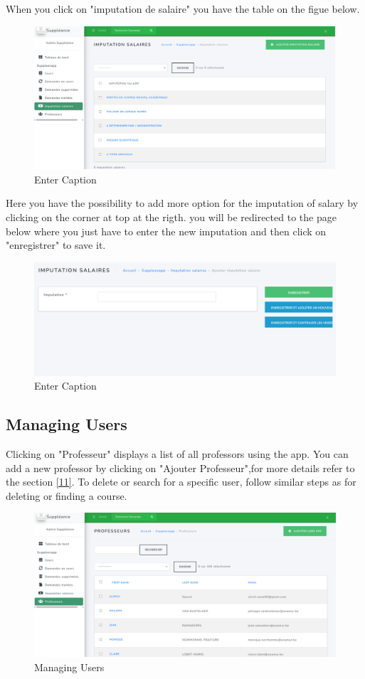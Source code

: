 \documentclass[12pt]{article}
\begin{document}
When you click on "imputation de salaire" you have the table on the figue below.
\begin{figure}[H]
    \centering
    \includegraphics[width=0.75\linewidth]{image35.png}
    \caption{Enter Caption}
\end{figure}
Here you have the possibility to add more option for the imputation of salary by clicking on the corner at top at the rigth.
you will be redirected to the page below where you just have to enter the new imputation and then click on "enregistrer" to  save it. 
\begin{figure}[H]
    \centering
    \includegraphics[width=0.75\linewidth]{image36.png}
    \caption{Enter Caption}
\end{figure}


\subsection{Managing Users}

Clicking on "Professeur" displays a list of all professors using the app. You can add a new professor by clicking on "Ajouter Professeur",for more details refer to the section \textcolor{blue}{\ref{11}}. To delete or search for a specific user, follow similar steps as for deleting or finding a course.

\begin{figure}[H]
    \centering
    \includegraphics[width=0.75\linewidth]{image37.png}
    \caption{Managing Users}
\end{figure}
\end{document}
